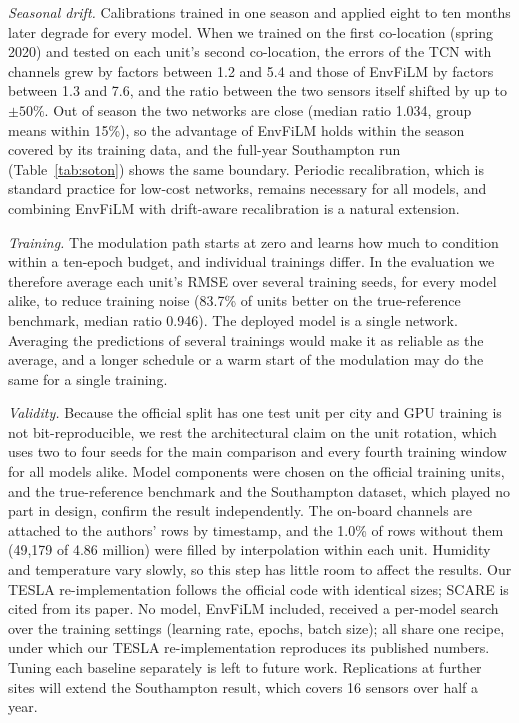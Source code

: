 \documentclass[journal]{IEEEtran}
\begin{document}
\textit{Seasonal drift.} Calibrations trained in one season and applied eight to ten months later degrade for every
model. When we trained on the first co-location (spring 2020) and tested on each unit's second co-location, the errors
of the TCN with channels grew by factors between 1.2 and 5.4 and those of EnvFiLM by factors between 1.3 and 7.6, and
the ratio between the two sensors itself shifted by up to $\pm50\%$. Out of season the two networks are close (median
ratio 1.034, group means within 15\%), so the advantage of EnvFiLM holds within the season covered by its training
data, and the full-year Southampton run (Table~\ref{tab:soton}) shows the same boundary. Periodic recalibration, which is standard
practice for low-cost networks, remains necessary for all models, and combining EnvFiLM with drift-aware
recalibration is a natural extension.

\textit{Training.} The modulation path starts at zero and learns how much to condition within a ten-epoch budget, and
individual trainings differ. In the evaluation we therefore average each unit's RMSE over several training seeds, for
every model alike, to reduce training noise (83.7\% of units better on the true-reference benchmark, median ratio
0.946). The deployed model is a single network. Averaging the predictions of several trainings would make it as reliable as
the average, and a longer schedule or a warm start of the modulation may do the same for a single training.

\textit{Validity.} Because the official split has one test unit per city and GPU training is not bit-reproducible, we
rest the architectural claim on the unit rotation, which uses two to four seeds for the main comparison and every
fourth training window for all models alike. Model components were chosen on the official training units, and the
true-reference benchmark and the Southampton dataset, which played no part in design, confirm the result
independently. The on-board channels are attached to the authors' rows by timestamp, and the 1.0\% of rows
without them (49,179 of 4.86 million) were filled by interpolation within each unit. Humidity and temperature vary slowly,
so this step has little room to affect the results. Our TESLA re-implementation follows the official code with identical sizes; SCARE is cited from its paper. No model,
EnvFiLM included, received a per-model search over the training settings (learning rate, epochs, batch size); all
share one recipe, under which our TESLA
re-implementation reproduces its published numbers. Tuning each baseline separately is left to future work.
Replications at further sites will extend the Southampton result, which covers 16 sensors over half a year.
\end{document}
